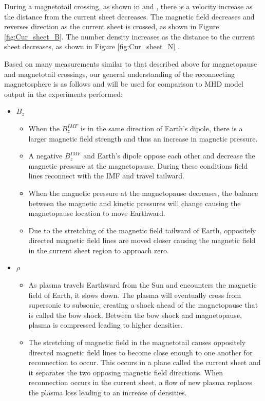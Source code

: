 During a magnetotail crossing, as shown in \citet{Runov2006} and
 \citet{Hwang2013}, there is a velocity increase as the distance from the
current sheet decreases. The magnetic field decreases and reverses direction as the current
sheet is crossed, as shown in Figure \ref{fig:Cur_sheet_B}. The number density
increases as the distance to the current sheet decreases, as shown in Figure
\ref{fig:Cur_sheet_N} \citep{Kennel}.

Based on many measurements similar to that described above for magnetopause and
magnetotail crossings, our general understanding of the reconnecting
magnetosphere is as follows and will be used for comparison to MHD model output
in the experiments performed:
\begin{itemize}
	\item $B_z$
	\begin{itemize}
	  \item When the $B_z^{IMF}$ is in the same direction of Earth's dipole, there
	  is a larger magnetic field strength and thus an increase in magnetic
	  pressure.
	  \item A negative $B_z^{IMF}$ and Earth's dipole oppose each
		other and decrease the magnetic pressure at the magnetopause. During these
		conditions field lines reconnect with the IMF and travel tailward.
	  \item When the magnetic pressure at the magnetopause decreases, the
	balance between the magnetic and kinetic pressures will change causing the
	magnetopause location to move Earthward.
	  \item Due to the stretching of the magnetic field tailward of Earth,
	oppositely directed magnetic field lines are moved closer causing the magnetic
	field in the current sheet region to approach zero.
	\end{itemize}
	
\item $\rho$
	\begin{itemize}
		\item As plasma travels Earthward from the Sun and encounters the magnetic
		field of Earth, it slows down. The plasma will eventually cross from
		supersonic to subsonic, creating a shock ahead of the magnetopause that is
		called the bow shock. Between the bow shock and magnetopause, plasma is
		compressed leading to higher densities.
		\item The stretching of magnetic field in the magnetotail causes oppositely
		directed magnetic field lines to become close enough to one another for
		reconnection to occur. This occurs in a plane called the current sheet and it
		separates the two opposing magnetic field directions. When reconnection occurs
		in the current sheet, a flow of new plasma replaces the plasma loss leading to
		an increase of densities. 
	\end{itemize}
	

\end{itemize}
